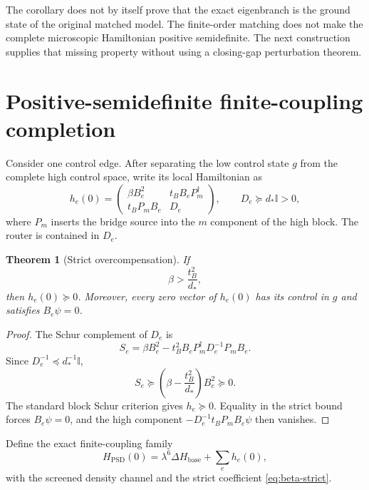 \documentclass[11pt]{article}
\newtheorem{theorem}{Theorem}[section]
\theoremstyle{definition}
\theoremstyle{remark}
\newcommand{\Id}{\mathbb I}
\begin{document}
The corollary does not by itself prove that the exact eigenbranch is the ground state of the original matched model.  The finite-order matching does not make the complete microscopic Hamiltonian positive semidefinite.  The next construction supplies that missing property without using a closing-gap perturbation theorem.

\section{Positive-semidefinite finite-coupling completion}

Consider one control edge.  After separating the low control state $g$ from the complete high control space, write its local Hamiltonian as
\begin{equation}
 h_e(0)=
 \begin{pmatrix}
 \beta B_e^2&t_BB_eP_m^\dagger\\
 t_BP_mB_e&D_e
 \end{pmatrix},
 \qquad
 D_e\succeq d_*\Id>0,
 \label{eq:local-block}
\end{equation}
where $P_m$ inserts the bridge source into the $m$ component of the high block.  The router is contained in $D_e$.

\begin{theorem}[Strict overcompensation]
\label{thm:overcomp}
If
\begin{equation}
 \beta>\frac{t_B^2}{d_*},
 \label{eq:beta-strict}
\end{equation}
then $h_e(0)\succeq0$.  Moreover, every zero vector of $h_e(0)$ has its control in $g$ and satisfies $B_e\psi=0$.
\end{theorem}

\begin{proof}
The Schur complement of $D_e$ is
\begin{equation}
 S_e=\beta B_e^2-t_B^2B_eP_m^\dagger D_e^{-1}P_mB_e.
 \end{equation}
Since $D_e^{-1}\preceq d_*^{-1}\Id$,
\begin{equation}
 S_e\succeq\left(\beta-\frac{t_B^2}{d_*}\right)B_e^2\succeq0.
 \label{eq:Schur-bound}
\end{equation}
The standard block Schur criterion gives $h_e\succeq0$.  Equality in the strict bound forces $B_e\psi=0$, and the high component $-D_e^{-1}t_BP_mB_e\psi$ then vanishes.
\end{proof}

Define the exact finite-coupling family
\begin{equation}
 H_{\mathrm{PSD}}(0)
 =\lambda^6\Delta H_{\mathrm{base}}+\sum_e h_e(0),
 \label{eq:HPSD}
\end{equation}
with the screened density channel and the strict coefficient \eqref{eq:beta-strict}.
\end{document}
